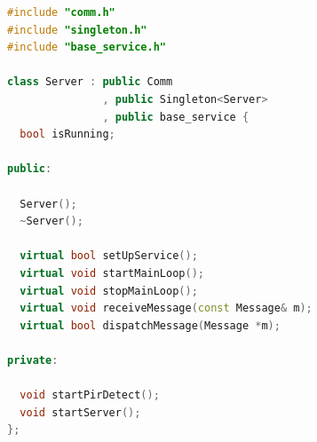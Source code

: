 \documentclass[11pt,a4paper,titlepage]{report}
\begin{document}
\begin{lstlisting}[caption=server.h,language=C++]
#include "comm.h"
#include "singleton.h"
#include "base_service.h"

class Server : public Comm
               , public Singleton<Server>
               , public base_service {
  bool isRunning;

public:

  Server();
  ~Server();

  virtual bool setUpService();
  virtual void startMainLoop();
  virtual void stopMainLoop();
  virtual void receiveMessage(const Message& m);
  virtual bool dispatchMessage(Message *m);

private:

  void startPirDetect();
  void startServer();
};

\end{lstlisting}
\end{document}
